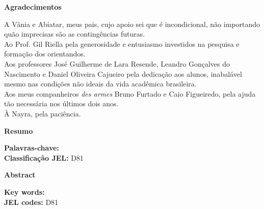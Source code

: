 \documentclass[11pt, a4paper]{article}
\theoremstyle{nonumberplain}
\theoremstyle{plain}
\theoremstyle{plain}
\theoremstyle{plain}
\theoremstyle{nonumberplain}
\begin{document}
\begin{titlepage}
\begin{center}
\textbf{\Large Agradecimentos}
\end{center}
\vspace{1.5cm}
A Vânia e Abiatar, meus pais, cujo apoio sei que é incondicional, não importando quão imprecisas são as contingências futuras. \\

\noindent
Ao Prof. Gil Riella pela generosidade e entusiasmo investidos na pesquisa e formação dos orientandos.\\ 

\noindent
Aos professores José Guilherme de Lara Resende, Leandro Gonçalves do Nascimento  e Daniel Oliveira Cajueiro pela dedicação aos alunos, inabalável mesmo nas condições não ideais da vida acadêmica brasileira.\\

\noindent
Aos meus companheiros \emph{des armes} Bruno Furtado e Caio Figueiredo, pela ajuda tão necessária nos últimos dois anos.\\ 

\noindent
À Nayra, pela paciência.     

 
\end{titlepage}

\begin{titlepage}
\begin{center}
\textbf{\Large Resumo}
\end{center}
\vspace{1.5cm}

\begin{flushleft}
\textbf{Palavras-chave:}\\
\textbf{Classificação JEL:} D81
\end{flushleft}
\end{titlepage}

\begin{titlepage}
\begin{center}
\textbf{\Large Abstract}
\end{center}
\vspace{1.5cm}
\begin{flushleft}
\textbf{Key words:}\\
\textbf{JEL codes:} D81
\end{flushleft}
\end{titlepage}

\clearpage
\tableofcontents
\clearpage
\end{document}
